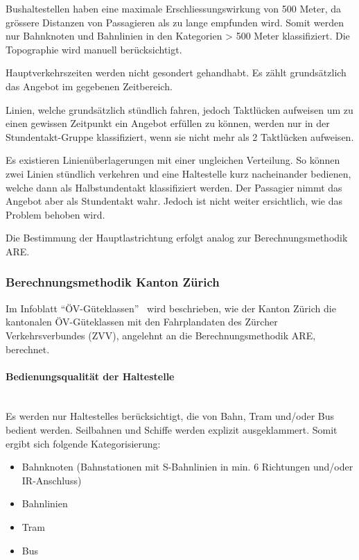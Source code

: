 Bushaltestellen haben eine maximale Erschliessungswirkung von 500 Meter, da grössere Distanzen von Passagieren als zu lange empfunden wird.
Somit werden nur Bahnknoten und Bahnlinien in den Kategorien > 500 Meter klassifiziert.
Die Topographie wird manuell berücksichtigt.

Hauptverkehrszeiten werden nicht gesondert gehandhabt.
Es zählt grundsätzlich das Angebot im gegebenen Zeitbereich.

Linien, welche grundsätzlich stündlich fahren, jedoch Taktlücken aufweisen um zu einen gewissen Zeitpunkt ein Angebot erfüllen zu können, werden nur in der Stundentakt-Gruppe klassifiziert, wenn sie nicht mehr als 2 Taktlücken aufweisen.

Es existieren Linienüberlagerungen mit einer ungleichen Verteilung.
So können zwei Linien stündlich verkehren und eine \gls{Haltestelle} kurz nacheinander bedienen, welche dann als Halbstundentakt klassifiziert werden.
Der Passagier nimmt das Angebot aber als Stundentakt wahr.
Jedoch ist nicht weiter ersichtlich, wie das Problem behoben wird.

Die Bestimmung der Hauptlastrichtung erfolgt analog zur Berechnungsmethodik ARE.


\subsubsection{Berechnungsmethodik Kanton Zürich}
\label{Lösungsansätze:Berechnungsmethodik Kanton Zürich}
Im Infoblatt "`ÖV-Güteklassen"'~\cite{oev-guteklassen-zh} wird beschrieben, wie der Kanton Zürich die kantonalen ÖV-Güteklassen mit den Fahrplandaten des Zürcher Verkehrsverbundes (ZVV), angelehnt an die Berechnungsmethodik \acs{ARE}, berechnet.

\paragraph{Bedienungsqualität der Haltestelle}~\\
\label{Berechnungsmethodik Kanton Zürich:Bedienungsqualität der Haltestelle}
Es werden nur \glspl{Haltestelle} berücksichtigt, die von Bahn, Tram und/oder Bus bedient werden.
Seilbahnen und Schiffe werden explizit ausgeklammert.
Somit ergibt sich folgende Kategorisierung:
\begin{itemize}
    \itemsep -1.5em
    \item Bahnknoten (Bahnstationen mit S-Bahnlinien in min. 6 Richtungen und/oder IR-Anschluss)
    \item Bahnlinien
    \item Tram
    \item Bus
\end{itemize}

